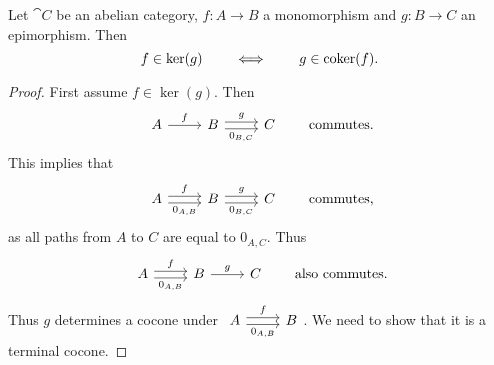 \begin{proposition} \label{kernelCokernelAdjunction}
Let $\cat{C}$ be an abelian category, $f: A\to B$ a monomorphism and $g: B\to C$ an epimorphism. Then
\[ f\in\ker(g) \qquad\iff\qquad g\in\operatorname{coker}(f). \]
\end{proposition}
\begin{proof}
First assume $f\in\ker(g)$. Then
\[ \begin{tikzcd}
A \arrow[r, "f"] & B \arrow[r, shift left, "g"] \arrow[r, shift right, swap, "{0_{B,C}}"] & C
\end{tikzcd} \qquad \text{commutes.} \]
This implies that
\[ \begin{tikzcd}
A \arrow[r, shift left, "f"] \arrow[r, shift right, swap, "{0_{A,B}}"] & B \arrow[r, shift left, "g"] \arrow[r, shift right, swap, "{0_{B,C}}"] & C
\end{tikzcd} \qquad \text{commutes,} \]
as all paths from $A$ to $C$ are equal to $0_{A,C}$. Thus
\[ \begin{tikzcd}
A \arrow[r, shift left, "f"] \arrow[r, shift right, swap, "{0_{A,B}}"] & B \arrow[r, "g"]  & C
\end{tikzcd} \qquad \text{also commutes.} \]
Thus $g$ determines a cocone under $\begin{tikzcd}
A \arrow[r, shift left, "f"] \arrow[r, shift right, swap, "{0_{A,B}}"] & B
\end{tikzcd}$. We need to show that it is a terminal cocone.


\end{proof}
